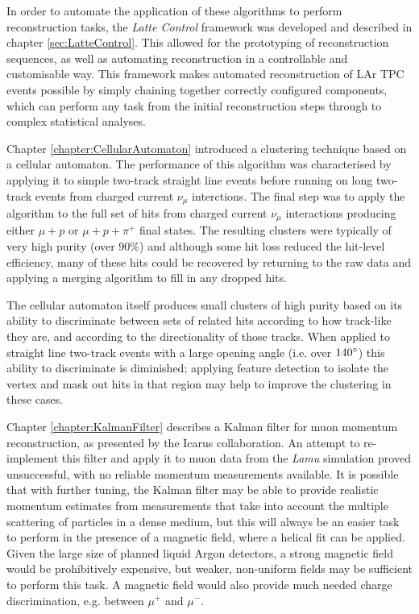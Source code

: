 In order to automate the application of these algorithms to perform reconstruction tasks, the \emph{Latte Control} framework was developed and described in chapter \ref{sec:LatteControl}. This allowed for the prototyping of reconstruction sequences, as well as automating reconstruction in a controllable and customisable way. This framework makes automated reconstruction of \ac{LAr TPC} events possible by simply chaining together correctly configured components, which can perform any task from the initial reconstruction steps through to complex statistical analyses.

Chapter \ref{chapter:CellularAutomaton} introduced a clustering technique based on a cellular automaton. The performance of this algorithm was characterised by applying it to simple two-track straight line events before running on long two-track events from charged current $\nu_\mu$ interctions. The final step was to apply the algorithm to the full set of hits from charged current $\nu_\mu$ interactions producing either $\mu + p$ or $\mu + p + \pi^+$ final states. The resulting clusters were typically of very high purity (over $90\%$) and although some hit loss reduced the hit-level efficiency, many of these hits could be recovered by returning to the raw data and applying a merging algorithm to fill in any dropped hits.

The cellular automaton itself produces small clusters of high purity based on its ability to discriminate between sets of related hits according to how track-like they are, and according to the directionality of those tracks. When applied to straight line two-track events with a large opening angle (i.e. over $140^\circ$) this ability to discriminate is diminished; applying feature detection to isolate the vertex and mask out hits in that region may help to improve the clustering in these cases.

Chapter \ref{chapter:KalmanFilter} describes a Kalman filter for muon momentum reconstruction, as presented by the Icarus collaboration. An attempt to re-implement this filter and apply it to muon data from the \emph{Lamu} simulation proved unsuccessful, with no reliable momentum measurements available. It is possible that with further tuning, the Kalman filter may be able to provide realistic momentum estimates from measurements that take into account the multiple scattering of particles in a dense medium, but this will always be an easier task to perform in the presence of a magnetic field, where a helical fit can be applied. Given the large size of planned liquid Argon detectors, a strong magnetic field would be prohibitively expensive, but weaker, non-uniform fields may be sufficient to perform this task. A magnetic field would also provide much needed charge discrimination, e.g. between $\mu^+$ and $\mu^-$.

